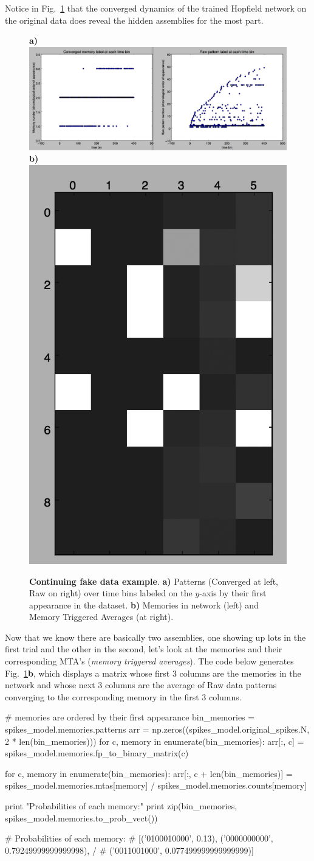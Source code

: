 \documentclass[letter, 12pt]{article}
\theoremstyle{definition}
\theoremstyle{remark}
\begin{document}
Notice in Fig.~\ref{fake_ex_fig2} that the converged dynamics of the trained Hopfield network on the original data does reveal the 
hidden assemblies for the most part.

\begin{figure}[t!]
\begin{center}
\textbf{a)}\includegraphics[width=.75\linewidth]{chron_order_patterns.png} 
\textbf{b)}\includegraphics[width=.19\linewidth]{memories_stas.png} 
\caption{\textbf{Continuing fake data example}. \textbf{a)} Patterns (Converged at left, Raw on right) over time bins labeled on the $y$-axis by their first appearance in the dataset.  \textbf{b)}  Memories in network (left) and Memory Triggered Averages (at right).}
\label{fake_ex_fig2}
\vspace{-.8cm}
\end{center}
\end{figure}

Now that we know there are basically two assemblies, one showing up lots in the first trial and the other in the second, let's look at the
memories and their corresponding MTA's (\textit{memory triggered averages}).  The code below generates Fig.~\ref{fake_ex_fig2}\textbf{b}, which displays
a matrix whose first 3 columns are the memories in the network and whose next 3 columns are the average of Raw data patterns converging to the corresponding memory in the first 3 columns.

\begin{python}
# memories are ordered by their first appearance
bin_memories = spikes_model.memories.patterns
arr = np.zeros((spikes_model.original_spikes.N, 2 * len(bin_memories)))
for c, memory in enumerate(bin_memories):
	arr[:, c] = spikes_model.memories.fp_to_binary_matrix(c)

for c, memory in enumerate(bin_memories):
	arr[:, c + len(bin_memories)] = spikes_model.memories.mtas[memory] /
			spikes_model.memories.counts[memory]

print "Probabilities of each memory:"
print zip(bin_memories, spikes_model.memories.to_prob_vect())

# Probabilities of each memory:
# [('0100010000', 0.13), ('0000000000', 0.79249999999999998), /
# ('0011001000', 0.077499999999999999)]
\end{python}
\end{document}
